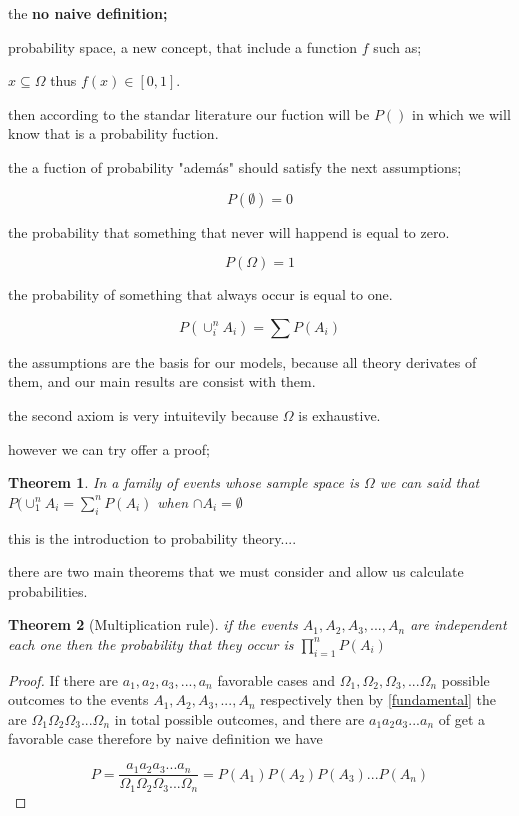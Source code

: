\documentclass[10pt,a4paper]{article}
\newtheorem{theorem}{Theorem}[section]
\begin{document}
the \textbf{no naive definition;}

probability space, a new concept, 
that include a function $f$ such as; 

$x \subseteq \Omega $ thus $f(x) \in [0,1]$.

then according to the standar literature our fuction will be $P()$ in which we will know that is a probability fuction.

the a fuction of probability "además" should satisfy the next assumptions;



$$P(\emptyset)=0$$

the probability that something that never will happend is equal to zero.


$$P(\Omega)=1$$

the probability of something that always occur is equal to one.

$$P(\cup_{i}^{n} A_{i})=\sum P(A_{i})$$



the assumptions are the basis for our models, because all theory derivates of them, and our main results are consist with them.



the second axiom is very intuitevily because $\Omega$ is exhaustive.

however we can try offer a proof;
\begin{theorem}

In a family of events whose sample space is $\Omega$ we can said that $P(\cup_{1}^{n}A_{i}= \sum_{i}^{n}P(A_{i})$ when $\cap A_{i}=\emptyset$

\end{theorem}




this is the introduction to probability theory....

there are two main theorems that we must consider and allow us calculate probabilities.

\begin{theorem}[Multiplication rule]
\label{multiplication}
if the events $A_{1},A_{2},A_{3},...,A_{n}$ are independent each one then the probability that they occur is $\prod_{i=1}^n P(A_{i})$
\end{theorem}

\begin{proof}
If there are $a_{1},a_{2},a_{3},...,a_{n}$ favorable cases and $\Omega_{1},\Omega_{2},\Omega_{3},...\Omega_{n}$ possible outcomes to the events $A_{1},A_{2},A_{3},...,A_{n}$ respectively then  by \ref{fundamental} the are  $\Omega_{1}\Omega_{2} \Omega_{3}...\Omega_{n}$ in total possible outcomes, and there are $a_{1} a_{2} a_{3}...a_{n}$ of get a  favorable case therefore by naive definition we have

$$P=\dfrac{a_{1} a_{2} a_{3}...a_{n}}{\Omega_{1}\Omega_{2} \Omega_{3}...\Omega_{n}}=P(A_{1})P(A_{2})P(A_{3})...P(A_{n})$$

 
\end{proof}
\end{document}
